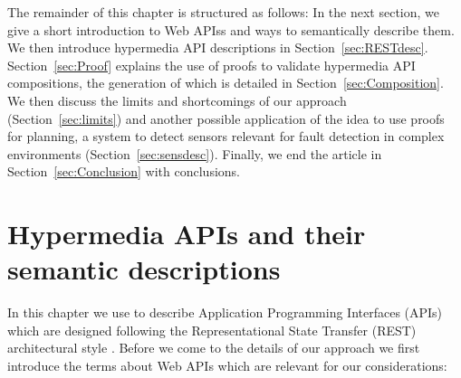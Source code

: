 The remainder of this chapter is structured as follows: %
% 
In the next section, we give a short introduction to Web APIss and ways to semantically describe them. %
We then introduce hypermedia API descriptions in Section~\ref{sec:RESTdesc}.
Section~\ref{sec:Proof} explains the use of proofs
to validate hypermedia API compositions,
the generation of which is detailed in Section~\ref{sec:Composition}.
We then discuss the limits and shortcomings of our approach (Section~\ref{sec:limits}) and another possible application of the idea to use proofs for planning, a system to detect 
sensors relevant for fault detection in complex environments (Section~\ref{sec:sensdesc}).
Finally, we end the article in Section~\ref{sec:Conclusion} with conclusions.

\section{Hypermedia APIs and their semantic descriptions}
In this chapter we use \nthreelogic to describe Application Programming Interfaces (APIs) which are designed following the
Representational
State Transfer (REST) architectural style \cite{REST}. Before we come to the details of our approach we first introduce
the terms about Web APIs which are relevant for our considerations:

